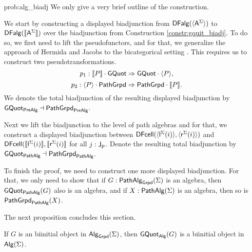 \begin{construction}{prob:alg_biadj}
\label{constr:alg_biadj}
We only give a very brief outline of the construction.

We start by constructing a displayed biadjunction
from $\DFAlg(\semPG{\pointconstr[\sign]})$
to $\DFAlg(\semP{\pointconstr[\sign]})$
over the biadjunction from
Construction \ref{constr:gquit_biadj}.
To do so, we first need to lift the pseudofunctors, and for that, we generalize the approach of Hermida and Jacobs
to the bicategorical setting \cite[Theorem 2.14]{hermida1998structural}.
This requires us to construct two pseudotransformations.
\[
p_1 : \pstrans{\semP{P} \cdot \gquot}{\gquot \cdot \semPG{P}},
\]
\[
p_2 : \pstrans{\semPG{P} \cdot \pgrpd}{\pgrpd \cdot \semP{P}}.
\]
We denote the total biadjunction of the resulting displayed biadjunction by $\pregquot \dashv \prepgrpd$.

Next we lift the biadjunction to the level of path algebras
and for that, we construct a displayed biadjunction between 
$\DCell(\semEG{\pathleft[\sign](i)},\semEG{\pathright[\sign](i)})$
and $\DCell(\semE{\pathleft[\sign](i)},\semE{\pathright[\sign](i)}$
for all $j : \pathlabel$.
Denote the resulting total biadjunction by $\pathgquot \dashv \pathpgrpd$.

To finish the proof, we need to construct one more displayed biadjunction.
For that, we only need to show that if $G : \pathalgG{\sign}$ is an algebra, then $\pathgquot(G)$ also is an algebra,
and if $X : \pathalg{\sign}$ is an algebra, then so is $\pathpgrpd(X)$.
\end{construction}

The next proposition concludes this section.

\begin{proposition}
\label{prop:biinitial_in_grpd}
If $G$ is an biinitial object in $\algG{\sign}$,
then $\alggquot(G)$ is a biinitial object in $\algebra{\sign}$.
\end{proposition}
